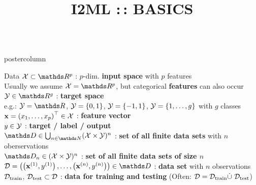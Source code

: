 \documentclass{beamer}
\title{I2ML :\,: BASICS} %
\newlength{\columnheight} %
\begin{document}
\begin{frame}[fragile]{}
\vspace{-8ex}
\begin{columns}
	\begin{column}{.31\textwidth}
		\begin{beamercolorbox}[center]{postercolumn}
			\begin{minipage}{.98\textwidth}
				\parbox[t][\columnheight]{\textwidth}{
					\begin{myblock}{Data}
					   $\Xspace \subset \R^p$ : $p$-dim. \textbf{input space} with $p$ features\\ 
            \hspace*{1ex}Usually we assume $\Xspace = \R^p$, but categorical \textbf{features} can also occur  \\
            
            $\Yspace \in \R^g$ : \textbf{target space} \\ 
            \hspace*{1ex}e.g.: $\Yspace = \R$, $\mathcal{Y} = \lbrace 0, 1 \rbrace$, $\mathcal{Y} = \lbrace -1, 1 \rbrace$, $\mathcal{Y} = \{1, \ldots, g\}$ with $g$ classes\\
            
            $\mathbf{x} = \left(x_1, \ldots, x_p\right)^\top \in \mathcal{X}$ : \textbf{feature vector} \\ 
             
            $y \in \mathcal{Y}$ : \textbf{target / label / output} \\
             
            $\allDatasets \in \defAllDatasets$ : \textbf{set of all finite data sets} with $n$ oberservations \\
             
            $\allDatasetsn \in \defAllDatasetsn$ : \textbf{set of all finite data sets of size $n$} \\
             
            $\D = \Dset \in \allDatasets $ : \textbf{data set} with $n$ observations \\
             
            $\mathcal{D}_{\text{train}}$, $\mathcal{D}_{\text{test}} \subset \mathcal{D}$ : \textbf{data for training and testing} (Often: $\mathcal{D} = \mathcal{D}_{\text{train}} \dot{\cup} ~ \mathcal{D}_{\text{test}}$)\\
             

\end{myblock}}
\end{minipage}
\end{beamercolorbox}
\end{column}
\end{columns}
\end{frame}
\end{document}
